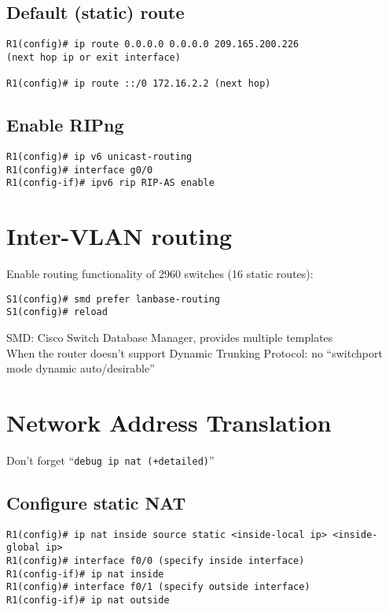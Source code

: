\documentclass[10pt, a4paper]{article}
\begin{document}
\subsection{Default (static) route}
\begin{lstlisting}
R1(config)# ip route 0.0.0.0 0.0.0.0 209.165.200.226
(next hop ip or exit interface)

R1(config)# ip route ::/0 172.16.2.2 (next hop)
\end{lstlisting}

\subsection{Enable RIPng}
\begin{lstlisting}
R1(config)# ip v6 unicast-routing
R1(config)# interface g0/0
R1(config-if)# ipv6 rip RIP-AS enable
\end{lstlisting}

\section{Inter-VLAN routing}
Enable routing functionality of 2960 switches (16 static routes):\\
\begin{lstlisting}
S1(config)# smd prefer lanbase-routing
S1(config)# reload
\end{lstlisting}
SMD: Cisco Switch Database Manager, provides multiple templates\\
When the router doesn't support Dynamic Trunking Protocol: no ``switchport mode dynamic auto/desirable''

\section{Network Address Translation}
Don't forget ``\texttt{debug ip nat (+detailed)}''
\subsection{Configure static NAT}
\begin{lstlisting}
R1(config)# ip nat inside source static <inside-local ip> <inside-global ip>
R1(config)# interface f0/0 (specify inside interface)
R1(config-if)# ip nat inside
R1(config)# interface f0/1 (specify outside interface)
R1(config-if)# ip nat outside
\end{lstlisting}
\end{document}
